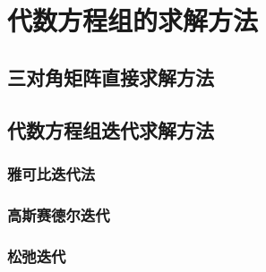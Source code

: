 \chapter{代数方程组的求解方法}
\section{三对角矩阵直接求解方法}
\section{代数方程组迭代求解方法}
\subsection{雅可比迭代法}
\subsection{高斯赛德尔迭代}
\subsection{松弛迭代}

